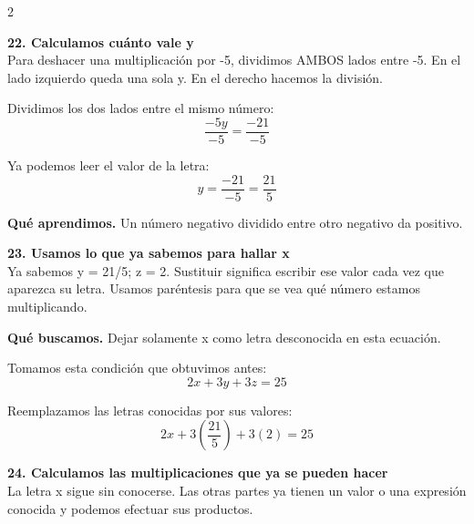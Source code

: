 \documentclass[11pt,a4paper,landscape]{article}
\begin{document}
\begin{multicols*}{2}
\begin{minipage}{\linewidth}
\end{minipage}\par\medskip
\noindent\begin{minipage}{\linewidth}\textbf{22. Calculamos cuánto vale y}\\[2pt]Para deshacer una multiplicación por -5, dividimos AMBOS lados entre -5. En el lado izquierdo queda una sola y. En el derecho hacemos la división.
\par\smallskip Dividimos los dos lados entre el mismo número:
\[\frac{-5y}{-5}=\frac{-21}{-5}\]
\par\smallskip Ya podemos leer el valor de la letra:
\[y=\frac{-21}{-5}=\frac{21}{5}\]
\par\smallskip\textbf{Qué aprendimos.} Un número negativo dividido entre otro negativo da positivo.
\end{minipage}\par\medskip
\noindent\begin{minipage}{\linewidth}\textbf{23. Usamos lo que ya sabemos para hallar x}\\[2pt]Ya sabemos y = 21/5; z = 2. Sustituir significa escribir ese valor cada vez que aparezca su letra. Usamos paréntesis para que se vea qué número estamos multiplicando.
\par\smallskip\textbf{Qué buscamos.} Dejar solamente x como letra desconocida en esta ecuación.
\par\smallskip Tomamos esta condición que obtuvimos antes:
\[2x + 3y + 3z = 25\]
\par\smallskip Reemplazamos las letras conocidas por sus valores:
\[2x + 3\left(\frac{21}{5}\right) + 3\left(2\right)=25\]
\end{minipage}\par\medskip
\noindent\begin{minipage}{\linewidth}\textbf{24. Calculamos las multiplicaciones que ya se pueden hacer}\\[2pt]La letra x sigue sin conocerse. Las otras partes ya tienen un valor o una expresión conocida y podemos efectuar sus productos.
\par{}\par\smallskip

\end{minipage}
\end{multicols*}
\end{document}
